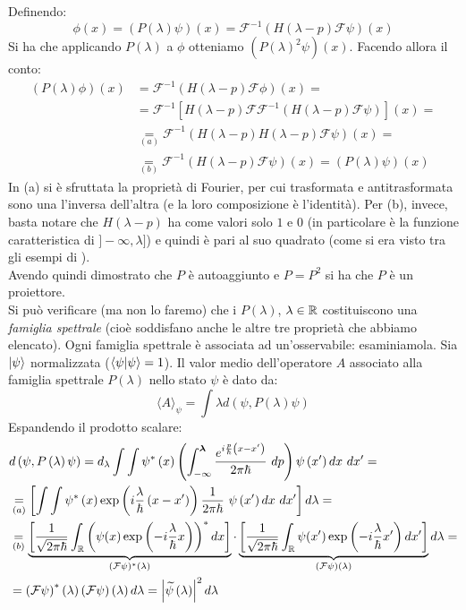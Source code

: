 \documentclass[../../FisicaTeorica.tex]{subfiles}
\begin{document}
Definendo:
\[
\phi(x) = (P(\lambda)\psi)(x) = \mathcal{F}^{-1}(H(\lambda-p)\mathcal{F}\psi)(x)
\]
Si ha che applicando $P(\lambda)$ a $\phi$ otteniamo $(P(\lambda)^2\psi)(x)$. Facendo allora il conto:
\begin{align*}
    (P(\lambda)\phi)(x) &= \mathcal{F}^{-1}(H(\lambda-p)\mathcal{F}\phi)(x) =\\
    &= \mathcal{F}^{-1}[H(\lambda-p) \mathcal{F}\mathcal{F}^{-1}(H(\lambda-p)\mathcal{F}\psi)](x) =\\
    &\underset{(a)}{=} \mathcal{F}^{-1}(H(\lambda-p)H(\lambda-p)\mathcal{F}\psi)(x) =\\
    &\underset{(b)}{=} \mathcal{F}^{-1}(H(\lambda-p)\mathcal{F}\psi)(x) = (P(\lambda)\psi)(x)
\end{align*}
In (a) si è sfruttata la proprietà di Fourier, per cui trasformata e antitrasformata sono una l'inversa dell'altra (e la loro composizione è l'identità). Per (b), invece, basta notare che $H(\lambda-p)$ ha come valori solo $1$ e $0$ (in particolare è la funzione caratteristica di $]-\infty, \lambda]$) e quindi è pari al suo quadrato (come si era visto tra gli esempi di ).\\
Avendo quindi dimostrato che $P$ è autoaggiunto e $P=P^2$ si ha che $P$ è un proiettore.\\
Si può verificare (ma non lo faremo) che i $P(\lambda)$, $\lambda \in \mathbb{R}$ costituiscono una \textit{famiglia spettrale} (cioè soddisfano anche le altre tre proprietà che abbiamo elencato). Ogni famiglia spettrale è associata ad un'osservabile: esaminiamola.
Sia $\ket{\psi}$ normalizzata ($\braket{\psi|\psi} = 1$). Il valor medio dell'operatore $A$ associato alla famiglia spettrale $P(\lambda)$ nello stato $\psi$ è dato da:
\begin{equation}
\langle A \rangle_\psi = \int \lambda d(\psi, P(\lambda)\psi)
\label{eqn:valormediop}
\end{equation}
Espandendo il prodotto scalare: 
\begin{align*}
&d\left(\psi,P\left(\lambda\right)\psi\right)=d_\lambda\int \int \psi^*\left(x\right)
\left ( \int_{-\infty}^{\bm{\lambda}}\frac{e^{i\frac{p}{\hbar}\left(x-x'\right)}}{2\pi\hbar}\ dp\right )
\psi\left(x'\right)dx\ dx'=\\
&\underset{(a)}{=}\left[\int\int\psi^*\left(x\right)
\exp \left ({i\frac{\lambda}{\hbar}\left(x-x'\right)}\right ) \frac{1}{2\pi\hbar}\ \psi\left(x'\right)dx\ dx'\right]d\lambda =\\
&\underset{(b)}{=} \underbrace{\left [ \frac{1}{\sqrt{2\pi\hbar }}\int_\bb{R} \left ( \psi(x) \exp \left (-i\frac{\lambda}{\hbar}x\right )\right )^*dx \right ]}_{(\mathcal{F}\psi)^*(\lambda)}
\cdot 
\underbrace{\left [ \frac{1}{\sqrt{2\pi\hbar}} \int_\bb{R} \psi(x') \exp\left (-i\frac{\lambda}{\hbar}x'\right )dx' \right ]}_{(\mathcal{F}\psi)(\lambda)}
d\lambda =\\
&= \left(\mathcal{F}\psi\right)^*\left(\lambda\right)\left(\mathcal{F}\psi\right)\left(\lambda\right)d\lambda=\left|\widetilde{\psi}\left(\lambda\right)\right|^2d\lambda 
\end{align*}
\end{document}
